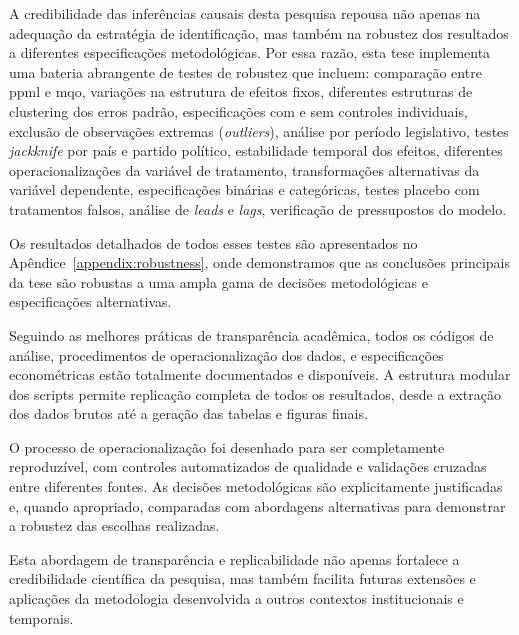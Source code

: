 A credibilidade das inferências causais desta pesquisa repousa não apenas na adequação da estratégia de identificação, mas também na robustez dos resultados a diferentes especificações metodológicas. Por essa razão, esta tese implementa uma bateria abrangente de testes de robustez que incluem: comparação entre \acrshort{ppml} e \acrshort{mqo}, variações na estrutura de efeitos fixos, diferentes estruturas de clustering dos erros padrão, especificações com e sem controles individuais, exclusão de observações extremas (\textit{outliers}), análise por período legislativo, testes \textit{jackknife} por país e partido político, estabilidade temporal dos efeitos, diferentes operacionalizações da variável de tratamento, transformações alternativas da variável dependente, especificações binárias e categóricas, testes placebo com tratamentos falsos, análise de \textit{leads} e \textit{lags}, verificação de pressupostos do modelo.

Os resultados detalhados de todos esses testes são apresentados no Apêndice~\ref{appendix:robustness}, onde demonstramos que as conclusões principais da tese são robustas a uma ampla gama de decisões metodológicas e especificações alternativas.

Seguindo as melhores práticas de transparência acadêmica, todos os códigos de análise, procedimentos de operacionalização dos dados, e especificações econométricas estão totalmente documentados e disponíveis. A estrutura modular dos scripts permite replicação completa de todos os resultados, desde a extração dos dados brutos até a geração das tabelas e figuras finais.

O processo de operacionalização foi desenhado para ser completamente reproduzível, com controles automatizados de qualidade e validações cruzadas entre diferentes fontes. As decisões metodológicas são explicitamente justificadas e, quando apropriado, comparadas com abordagens alternativas para demonstrar a robustez das escolhas realizadas.

Esta abordagem de transparência e replicabilidade não apenas fortalece a credibilidade científica da pesquisa, mas também facilita futuras extensões e aplicações da metodologia desenvolvida a outros contextos institucionais e temporais.